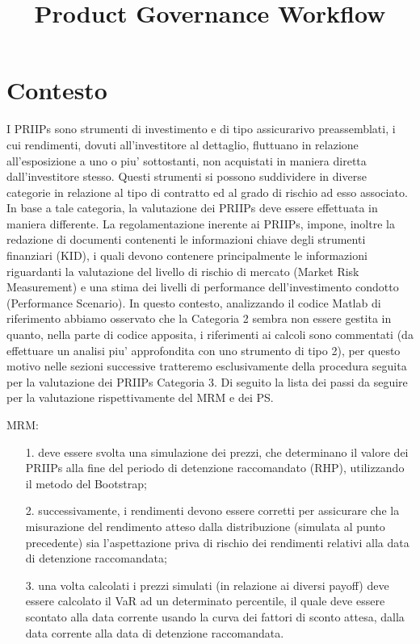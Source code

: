 \documentclass[11pt,fleqn]{extarticle}
\title{Product Governance Workflow}
\begin{document}
\maketitle
\tableofcontents
\pagestyle{empty} %
\pagestyle{plain} %

\newpage
\section{Contesto}
I PRIIPs sono strumenti di investimento e di tipo assicurarivo preassemblati, i cui rendimenti, dovuti all'investitore al dettaglio, fluttuano in relazione all'esposizione a uno o piu' sottostanti, non acquistati in maniera diretta dall'investitore stesso.\newline
Questi strumenti si possono suddividere in diverse categorie in relazione al tipo di contratto ed al grado di rischio ad esso associato. In base a tale categoria, la valutazione dei PRIIPs deve essere effettuata in maniera differente.\newline
La regolamentazione inerente ai PRIIPs, impone, inoltre la redazione di documenti contenenti le informazioni chiave degli strumenti finanziari (KID), i quali devono contenere principalmente le informazioni riguardanti la valutazione del livello di rischio di mercato (Market Risk Measurement) e una stima dei livelli di performance dell'investimento condotto (Performance Scenario). \newline
In questo contesto, analizzando il codice Matlab di riferimento abbiamo osservato che la Categoria 2 sembra non essere gestita in quanto, nella parte di codice apposita, i riferimenti ai calcoli sono commentati (da effettuare un analisi piu' approfondita con uno strumento di tipo 2), per questo motivo nelle sezioni successive tratteremo esclusivamente della procedura seguita per la valutazione dei PRIIPs Categoria 3.\newline
Di seguito la lista dei passi da seguire per la valutazione rispettivamente del MRM e dei PS.\newline

MRM:
\begin{itemize}
\item[1.] deve essere svolta una simulazione dei prezzi, che determinano il valore dei PRIIPs alla fine del periodo di detenzione raccomandato (RHP), utilizzando il metodo del Bootstrap;
\item[2.] successivamente, i rendimenti devono essere corretti per assicurare che la misurazione del rendimento atteso dalla distribuzione (simulata al punto precedente) sia l'aspettazione priva di rischio dei rendimenti relativi alla data di detenzione raccomandata;
\item[3.] una volta calcolati i prezzi simulati (in relazione ai diversi payoff) deve essere calcolato il VaR ad un determinato percentile, il quale deve essere scontato alla data corrente usando la curva dei fattori di sconto attesa, dalla data corrente alla data di detenzione raccomandata.
\end{itemize}
\end{document}
